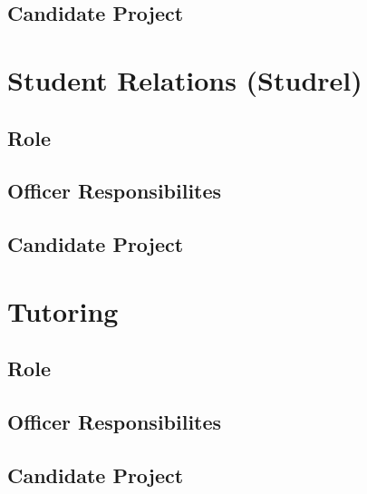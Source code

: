 \documentclass[11pt, article, oneside]{memoir}
\begin{document}
    \subsection{Candidate Project}


    \bigbreak

    
    \section{Student Relations (Studrel)}
    \subsection{Role}

    \subsection{Officer Responsibilites}

    \subsection{Candidate Project}


    \bigbreak

    
    \section{Tutoring}
    \subsection{Role}

    \subsection{Officer Responsibilites}

    \subsection{Candidate Project}

    
    \bigbreak
    


    \newpage
\end{document}

